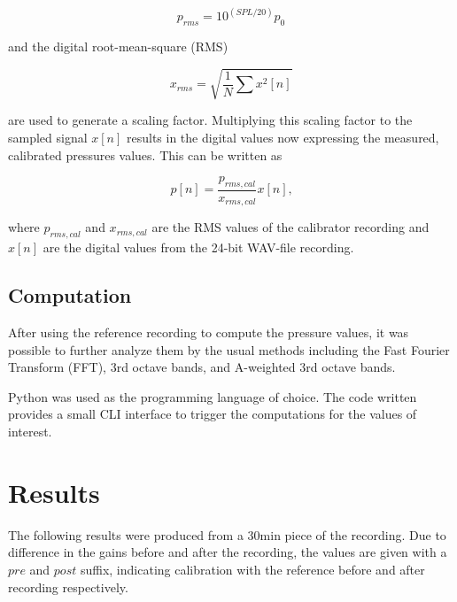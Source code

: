 \documentclass[twocolumn]{article}
\begin{document}
\begin{equation}
    p_{rms} = 10^{\left(SPL/20\right)}p_{0}
\end{equation}

and the digital root-mean-square (RMS)

\begin{equation}
    x_{rms} = \sqrt{\frac{1}{N}\sum x^2\left[n\right]}
\end{equation}

are used to generate a scaling factor.
Multiplying this scaling factor to the sampled signal $x[n]$ results in the digital
values now expressing the measured, calibrated pressures values.
This can be written as

\begin{equation}
    p\left[n\right] = \frac{p_{rms,cal}}{x_{rms,cal}}x\left[n\right]\textrm{,}
\end{equation}

where $p_{rms,cal}$ and $x_{rms,cal}$ are the RMS values of the calibrator recording
and $x\left[n\right]$ are the digital values from the 24-bit WAV-file recording.

\subsection{Computation}
After using the reference recording to compute the pressure values, it was possible
to further analyze them by the usual methods including the Fast Fourier Transform
(FFT), 3rd octave bands, and A-weighted 3rd octave bands.

Python was used as the programming language of choice.
The code written provides a small CLI interface to trigger the computations for the
values of interest.

\section{Results}
The following results were produced from a $30\textrm{min}$ piece of the recording.
Due to difference in the gains before and after the recording, the values are given with a $pre$ and $post$ suffix,
indicating calibration with the reference before and after recording respectively.
\end{document}
